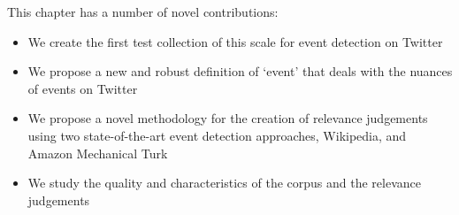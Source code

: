 
This chapter has a number of novel contributions:
\begin{itemize}
\item We create the first test collection of this scale for event detection on Twitter
\item We propose a new and robust definition of `event' that deals with the nuances of events on Twitter
\item We propose a novel methodology for the creation of relevance judgements using two state-of-the-art event detection approaches, Wikipedia, and Amazon Mechanical Turk
\item We study the quality and characteristics of the corpus and the relevance judgements
\end{itemize}
